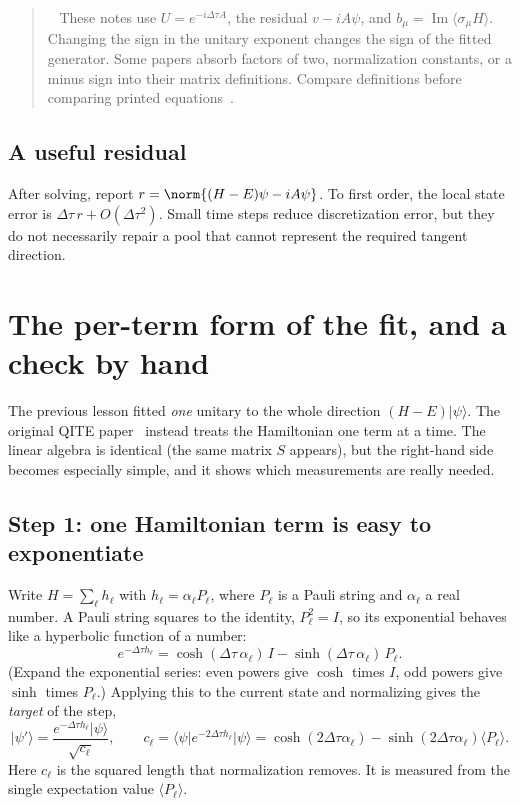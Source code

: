 \documentclass[11pt,a4paper]{article}
\newcommand{\ket}[1]{\lvert #1\rangle}
\newcommand{\bra}[1]{\langle #1\rvert}
\newcommand{\ex}[1]{\langle #1\rangle}
\newcommand{\Ima}{\operatorname{Im}}
\newcommand{\dt}{\Delta\tau}
\newcommand{\lesson}[2]{\clearpage\section{#1}\label{#2}}
\newenvironment{caution}[1][Important distinction]{\par\smallskip\begin{quotation}\noindent{\bfseries\textcolor{alertred}{#1.}}\ }{\end{quotation}\smallskip}
\begin{document}
\begin{caution}[Our convention is fixed]
These notes use $U=e^{-i\dt A}$, the residual $v-iA\psi$, and $b_\mu=\Ima\ex{\sigma_\mu H}$. Changing the sign in the unitary exponent changes the sign of the fitted generator. Some papers absorb factors of two, normalization constants, or a minus sign into their matrix definitions. Compare definitions before comparing printed equations~\cite{motta}.
\end{caution}

\subsection*{A useful residual}
After solving, report $r=\norm{(H-E)\psi-iA\psi}$. To first order, the local state error is $\dt\,r+O(\dt^2)$. Small time steps reduce discretization error, but they do not necessarily repair a pool that cannot represent the required tangent direction.

\lesson{The per-term form of the fit, and a check by hand}{sec:perterm}
The previous lesson fitted \emph{one} unitary to the whole direction $(H-E)\ket\psi$. The original QITE paper~\cite{motta} instead treats the Hamiltonian one term at a time. The linear algebra is identical (the same matrix $S$ appears), but the right-hand side becomes especially simple, and it shows which measurements are really needed.

\subsection*{Step 1: one Hamiltonian term is easy to exponentiate}
Write $H=\sum_\ell h_\ell$ with $h_\ell=\alpha_\ell P_\ell$, where $P_\ell$ is a Pauli string and $\alpha_\ell$ a real number. A Pauli string squares to the identity, $P_\ell^2=I$, so its exponential behaves like a hyperbolic function of a number:
\begin{equation}\label{eq:coshsinh}
e^{-\dt h_\ell}=\cosh(\dt\,\alpha_\ell)\,I-\sinh(\dt\,\alpha_\ell)\,P_\ell .
\end{equation}
(Expand the exponential series: even powers give $\cosh$ times $I$, odd powers give $\sinh$ times $P_\ell$.) Applying this to the current state and normalizing gives the \emph{target} of the step,
\[
\ket{\psi'}=\frac{e^{-\dt h_\ell}\ket\psi}{\sqrt{c_\ell}},\qquad
c_\ell=\bra\psi e^{-2\dt h_\ell}\ket\psi=\cosh(2\dt\alpha_\ell)-\sinh(2\dt\alpha_\ell)\ex{P_\ell}.
\]
Here $c_\ell$ is the squared length that normalization removes. It is measured from the single expectation value $\ex{P_\ell}$.
\end{document}
